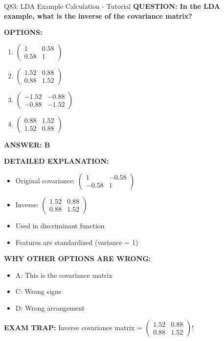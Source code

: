 \documentclass[8pt]{beamer}
\begin{document}
\begin{frame}{Q83: LDA Example Calculation - Tutorial}
	\fontsize{6.5}{7.5}\selectfont
	\textbf{QUESTION: In the LDA example, what is the inverse of the covariance matrix?}
	
	\vspace{0.1cm}
	\textbf{OPTIONS:}
	\begin{enumerate}
		\item $\begin{pmatrix} 1 & 0.58 \\ 0.58 & 1 \end{pmatrix}$
		\item $\begin{pmatrix} 1.52 & 0.88 \\ 0.88 & 1.52 \end{pmatrix}$
		\item $\begin{pmatrix} -1.52 & -0.88 \\ -0.88 & -1.52 \end{pmatrix}$
		\item $\begin{pmatrix} 0.88 & 1.52 \\ 1.52 & 0.88 \end{pmatrix}$
	\end{enumerate}
	
	\vspace{0.1cm}
	\textcolor{myblue}{\textbf{ANSWER: B}}
	
	\vspace{0.1cm}
	\textbf{DETAILED EXPLANATION:}
	\begin{itemize}
		\item Original covariance: $\begin{pmatrix} 1 & -0.58 \\ -0.58 & 1 \end{pmatrix}$
		\item Inverse: $\begin{pmatrix} 1.52 & 0.88 \\ 0.88 & 1.52 \end{pmatrix}$
		\item Used in discriminant function
		\item Features are standardized (variance = 1)
	\end{itemize}
	
	\vspace{0.1cm}
	\textcolor{myred}{\textbf{WHY OTHER OPTIONS ARE WRONG:}}
	\begin{itemize}
		\item \textcolor{myred}{A:} This is the covariance matrix
		\item \textcolor{myred}{C:} Wrong signs
		\item \textcolor{myred}{D:} Wrong arrangement
	\end{itemize}
	
	\textcolor{myred}{\textbf{EXAM TRAP:}} Inverse covariance matrix = \textcolor{myblue}{$\begin{pmatrix} 1.52 & 0.88 \\ 0.88 & 1.52 \end{pmatrix}$}!
\end{frame}
	
\end{document}
